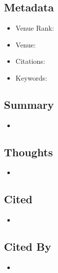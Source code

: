 \documentclass{article}
\begin{document}
\pagebreak



\section*{}

\subsection*{Metadata}
\begin{itemize}
	\item Venue Rank:
	\item Venue:
	\item Citations: 
	\item Keywords: 
\end{itemize}

\subsection*{Summary}
\begin{itemize}
	\item
\end{itemize}

\subsection*{Thoughts}
\begin{itemize}
	\item
\end{itemize}

\subsection*{Cited}
\begin{itemize}
	\item
\end{itemize}

\subsection*{Cited By}
\begin{itemize}
	\item
\end{itemize}
\end{document}
